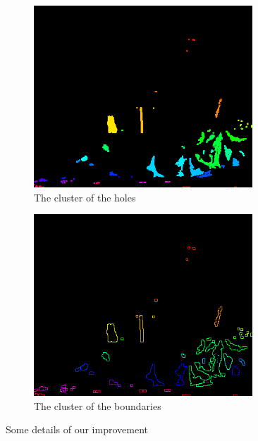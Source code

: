 \documentclass{article}
\begin{document}
\begin{CJK*}{UTF8}{bkai}
\begin{figure}[h]
\begin{subfigure}[h]{0.3\textwidth}
        \includegraphics[width=0.9\textwidth]{results/holes_cluster.png}
        \caption{The cluster of the holes}
        \label{fig:details_of_our_improvement_cluster_hole}
    \end{subfigure}
    \begin{subfigure}[h]{0.3\textwidth}
        \centering
        \includegraphics[width=0.9\textwidth]{results/boundries_cluster.png}
        \caption{The cluster of the boundaries}
        \label{fig:details_of_our_improvement_cluster_boundary}
    \end{subfigure}
    \caption{Some details of our improvement}
    \label{fig:details_of_our_improvement}
\end{figure}


\end{CJK*}
\end{document}
